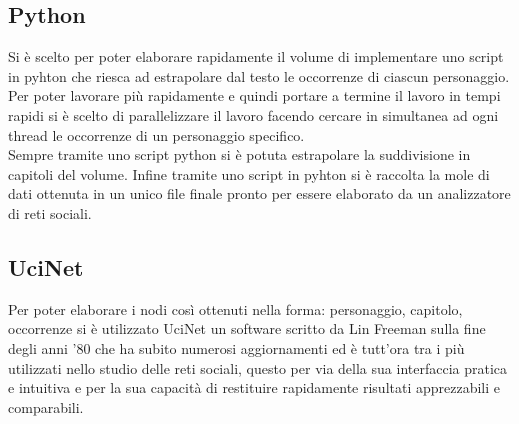 \documentclass[a4paper]{article}
\begin{document}
\subsection{Python}
Si è scelto per poter elaborare rapidamente il volume di implementare uno script in pyhton che riesca ad estrapolare dal testo le occorrenze di ciascun personaggio.\\
Per poter lavorare più rapidamente e quindi portare a termine il lavoro in tempi rapidi si è scelto di parallelizzare il lavoro facendo cercare in simultanea ad ogni thread le occorrenze di un personaggio specifico.\\
Sempre tramite uno script python si è potuta estrapolare la suddivisione in capitoli del volume.
Infine tramite uno script in pyhton si è raccolta la mole di dati ottenuta in un unico file finale pronto per essere elaborato da un analizzatore di reti sociali.

\subsection{UciNet}
Per poter elaborare i nodi così ottenuti nella forma: personaggio, capitolo, occorrenze si è utilizzato UciNet\cite{UciNet} un software scritto da Lin Freeman sulla fine degli anni '80 che ha subito numerosi aggiornamenti ed è tutt'ora tra i più utilizzati nello studio delle reti sociali, questo per via della sua interfaccia pratica e intuitiva e per la sua capacità di restituire rapidamente risultati apprezzabili e comparabili.
\end{document}

